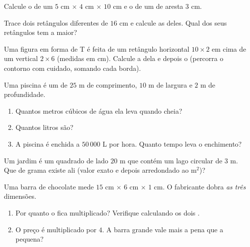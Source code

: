 \begin{exercise}[$\star$]\label{exo:g6:measure:7}
Calcule o  de um 
$5$ cm $\times$ $4$ cm $\times$ $10$ cm e o de um  de aresta
$3$ cm.
\end{exercise}

\begin{exercise}[$\star$]\label{exo:g6:measure:8}
Trace dois retângulos diferentes de  $16$ cm e calcule as
 deles. Qual dos seus retângulos tem a  maior?
\end{exercise}

\begin{exercise}[$\star\star$]\label{exo:g6:measure:9}
Uma figura em forma de T é feita de um retângulo horizontal
$10 \times 2$ em cima de um vertical $2 \times 6$ (medidas em cm).
Calcule a  dela e depois o  (percorra o contorno com
cuidado, somando cada borda).
\end{exercise}

\begin{exercise}[$\star\star$]\label{exo:g6:measure:10}
Uma piscina é um  de $25$ m de comprimento, $10$ m de
largura e $2$ m de profundidade.
\begin{enumerate}
  \item Quantos metros cúbicos de água ela leva quando cheia?
  \item Quantos litros são?
  \item A piscina é enchida a $50\,000$ L por hora. Quanto tempo leva o
        enchimento?
\end{enumerate}
\end{exercise}

\begin{exercise}[$\star\star$]\label{exo:g6:measure:11}
Um jardim é um quadrado de lado $20$ m que contém um lago circular de
 $3$ m. Que  de grama existe ali (valor exato e depois
arredondado ao m$^2$)?
\end{exercise}

\begin{exercise}[$\star\star\star$]\label{exo:g6:measure:12}
Uma barra de chocolate mede $15$ cm $\times$ $6$ cm $\times$ $1$ cm. O
fabricante dobra \emph{as três} dimensões.
\begin{enumerate}
  \item Por quanto o  fica multiplicado? Verifique calculando os
        dois .
  \item O preço é multiplicado por $4$. A barra grande vale mais a pena
        que a pequena?
\end{enumerate}
\end{exercise}

